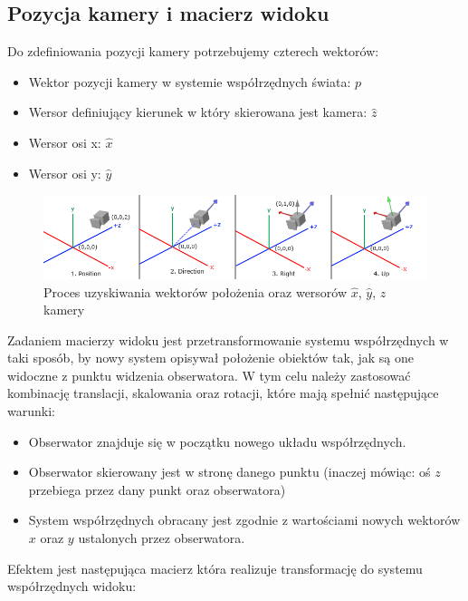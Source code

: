 \documentclass[a4paper]{article}
\begin{document}
\subsection{Pozycja kamery i macierz widoku}

Do zdefiniowania pozycji kamery potrzebujemy czterech wektorów:

\begin{itemize}
    \item Wektor pozycji kamery w systemie współrzędnych świata: $p$
    \item Wersor definiujący kierunek w który skierowana jest kamera: $\hat{z}$
    \item Wersor osi x: $\hat{x}$
    \item Wersor osi y: $\hat{y}$
\end{itemize}

\begin{figure}[H]
    \includegraphics[width=\textwidth]{camera_axes}
    \caption{Proces uzyskiwania wektorów położenia oraz wersorów $\hat{x}$,
        $\hat{y}$, $\hat{z}$ kamery}
\end{figure}

Zadaniem macierzy widoku jest przetransformowanie systemu współrzędnych w taki
sposób, by nowy system opisywał położenie obiektów tak, jak są one widoczne z
punktu widzenia obserwatora. W tym celu należy zastosować kombinację translacji,
skalowania oraz rotacji, które mają spełnić następujące warunki:

\begin{itemize}
    \item Obserwator znajduje się w początku nowego układu współrzędnych.
    \item Obserwator skierowany jest w stronę danego punktu (inaczej mówiąc:
          oś $z$ przebiega przez dany punkt oraz obserwatora)
    \item System współrzędnych obracany jest zgodnie z wartościami nowych
          wektorów $x$ oraz $y$ ustalonych przez obserwatora.
\end{itemize}

Efektem jest następująca macierz która realizuje transformację do systemu
współrzędnych widoku:
\end{document}
